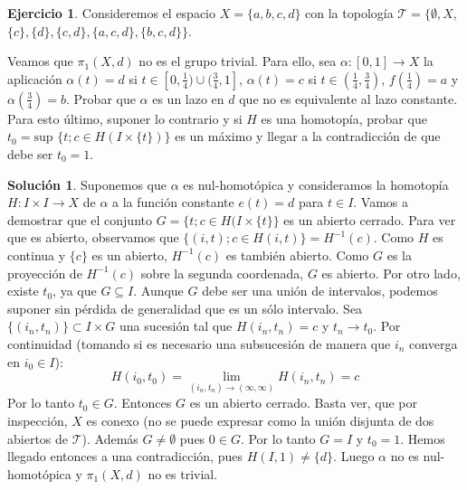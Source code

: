 \documentclass{article}
\theoremstyle{plain}
\theoremstyle{definition}
\newtheorem{exercise}{Ejercicio}
\newtheorem*{sol*}{Solución}
\begin{document}
\newpage \begin{exercise} Consideremos el espacio $X = \{a,b,c,d\}$ con la topología $\mathcal{T} = \{\emptyset, X$, $\{c\},\{d\}, \{c,d\}, \{a,c,d\}, \{b,c,d\}\}$.
\par
 Veamos que $\pi_1(X,d)$ no es el grupo trivial. Para ello, sea $\alpha: [0,1]\to X$ la aplicación $\alpha(t) = d$ si $t \in [0,\frac{1}{4}) \cup (\frac{3}{4},1]$, $\alpha(t) = c$ si $t\in (\frac{1}{4},\frac{3}{4})$, $f(\frac{1}{4}) = a$ y $\alpha(\frac{3}{4}) = b$.  Probar que $\alpha$ es un lazo en $d$ que no es equivalente al lazo constante. Para esto último, suponer lo contrario y si $H$ es una homotopía, probar que $t_0 = \mbox{sup }\{t; c\in H(I\times \{t\})\}$ es un máximo y llegar a la contradicción de que debe ser $t_0 = 1$.
\end{exercise}
\begin{sol*}
Suponemos que $\alpha$ es nul-homotópica y consideramos la homotopía $H : I \times I \to X$  de $\alpha$ a la función constante $e(t)=d$ para $t \in I$.
Vamos a demostrar que el conjunto $G = \{t ; c \in H(I \times \{t\}\}$ es un abierto cerrado. Para ver que es abierto, observamos que $\{(i,t) ; c \in H(i,t)\} = H^{-1}({c})$. Como $H$ es continua y $\{c\}$ es un abierto, $H^{-1}({c})$ es también abierto. Como $G$ es la proyección de $H^{-1}(c)$ sobre la segunda coordenada, $G$ es abierto. Por otro lado, existe $t_0$, ya que $G \subseteq I$. Aunque $G$ debe ser una unión de intervalos, podemos suponer sin pérdida de generalidad que es un sólo intervalo. Sea $\{(i_n,t_n)\}\subset I\times G$ una sucesión tal que $H(i_n,t_n) = c$ y $t_n \to t_0$. Por continuidad (tomando si es necesario una subsucesión de manera que $i_n$ converga en $i_0 \in I$):
\[ H(i_0,t_0) = \lim\limits_{(i_n,t_n)\to (\infty,\infty)}H(i_n,t_n) = c \]
Por lo tanto $t_0 \in G$. Entonces $G$ es un abierto cerrado. Basta ver, que por inspección, $X$ es conexo (no se puede expresar como la unión disjunta de dos abiertos de $\mathcal{T}$). Además $G\neq\emptyset$ pues $0\in G$. Por lo tanto $G = I$ y $t_0 = 1$. Hemos llegado entonces a una contradicción, pues $H(I,1) \neq \{d\}$. Luego $\alpha$ no es nul-homotópica y $\pi_1(X,d)$ no es trivial.
\end{sol*}
\end{document}
